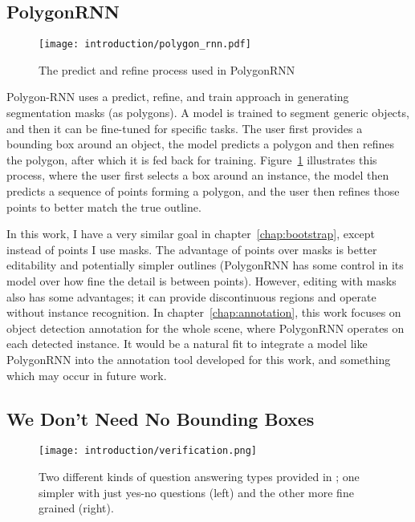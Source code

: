 \subsection {PolygonRNN \cite{Castrejon2017}}

\begin{figure}[h]
  \centering
  \texttt{[image: introduction/polygon\_rnn.pdf]}
  \caption{The predict and refine process used in PolygonRNN \cite{Castrejon2017}}  
  \label{fig:polygon_rnn}
\end{figure}


Polygon-RNN \cite{Castrejon2017} uses a predict, refine, and train approach in generating segmentation masks (as polygons). A model is trained to segment generic objects, and then it can be fine-tuned for specific tasks. The user first provides a bounding box around an object, the model predicts a polygon and then refines the polygon,  after which it is fed back for training. Figure~\ref{fig:polygon_rnn} illustrates this process, where the user first selects a box around an instance, the model then predicts a sequence of points forming a polygon, and the user then refines those points to better match the true outline.

In this work, I have a very similar goal in chapter~\ref{chap:bootstrap}, except instead of points I use masks. The advantage of points over masks is better editability and potentially simpler outlines (PolygonRNN has some control in its model over how fine the detail is between points). However, editing with masks also has some advantages; it can provide discontinuous regions and operate without instance recognition. In chapter~\ref{chap:annotation}, this work focuses on object detection annotation for the whole scene, where PolygonRNN operates on each detected instance. It would be a natural fit to integrate a model like PolygonRNN into the annotation tool developed for this work, and something which may occur in future work.


\subsection {We Don't Need No Bounding Boxes}

\begin{figure}[h]
  \centering
  \texttt{[image: introduction/verification.png]}
  \caption{Two different kinds of question answering types provided in \cite{Papadopoulos2016}; one simpler with just yes-no questions (left) and the other more fine grained (right).}
  \label{fig:verification}
\end{figure}

